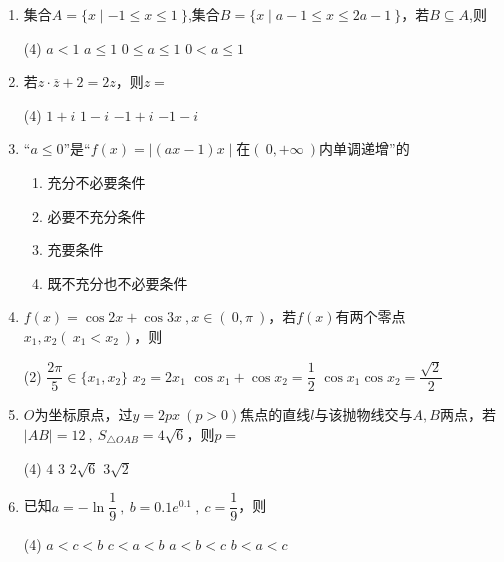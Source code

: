 \documentclass[11pt,a4paper]{ctexart}
\begin{document}
\begin{enumerate}

    \item 集合$A=\{x \mid -1 \le x \le 1\ \}$,集合$B=\{x\mid a-1\le x \le 2a-1\ \}$，若$B \subseteq A$,则
    \begin{tasks}(4)
        \task $a<1$ 
        \task $a \le 1$
        \task $0 \le a \le 1$
        \task $0 < a \le 1$
    \end{tasks}

    \item 若$z \cdot \overline{z}+2=2z $，则$z=$
    \begin{tasks}(4)
        \task $1+i$ 
        \task $1-i$
        \task $-1+i$
        \task $-1-i$
    \end{tasks}

    \item “$a \le 0 $”是“$f(x)= \mid (ax-1)x \mid $在$(\ 0, + \infty \ )$内单调递增”的
    \begin{enumerate}[label=(\Alph*)]
        \item 充分不必要条件
        \item 必要不充分条件
        \item 充要条件
        \item 既不充分也不必要条件
    \end{enumerate}

    \item $f(x)= \cos 2x+ \cos 3x\ ,x \in (\ 0,\pi \ )$，若$f(x)$有两个零点$x_1,x_2(\ x_1<x_2\ )$，则
    \begin{tasks}(2)
        \task $\dfrac{2\pi }{5} \in \{x_1,x_2\}$ 
        \task $x_2=2x_1$
        \task $\cos x_1+ \cos x_2=\dfrac{1}{2}$
        \task $\cos x_1 \cos x_2=\dfrac{\sqrt{2}}{2}$
    \end{tasks}
    
    \item $O$为坐标原点，过$y=2px\ (p>0)$焦点的直线$l$与该抛物线交与$A,B$两点，若$\mid AB \mid =12\ ,\ S_{\triangle OAB}=4\sqrt{6}$，则$p=$
    \begin{tasks}(4)
        \task $4$ 
        \task $3$
        \task $2 \sqrt{6}$
        \task $3 \sqrt{2}$
    \end{tasks}
    \newpage

    \item 已知$a=-\ln \dfrac{1}{9}\ ,\ b=0.1e^{0.1}\ ,\ c=\dfrac{1}{9}$，则
    \begin{tasks}(4)
        \task $a<c<b$ 
        \task $c<a<b$
        \task $a<b<c$
        \task $b<a<c$
    \end{tasks}


\end{enumerate}
\end{document}
